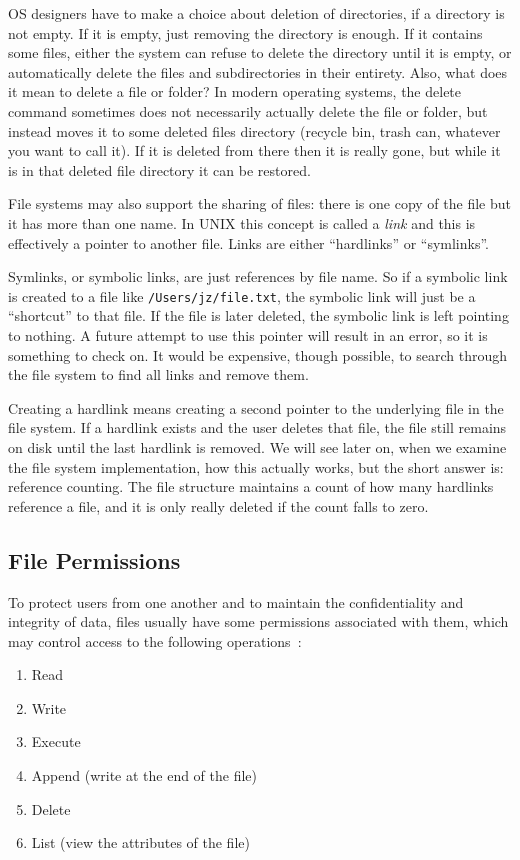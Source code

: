 OS designers have to make a choice about deletion of directories, if a directory is not empty. If it is empty, just removing the directory is enough. If it contains some files, either the system can refuse to delete the directory until it is empty, or automatically delete the files and subdirectories in their entirety. Also, what does it mean to delete a file or folder? In modern operating systems, the delete command sometimes does not necessarily actually delete the file or folder, but instead moves it to some deleted files directory (recycle bin, trash can, whatever you want to call it). If it is deleted from there then it is really gone, but while it is in that deleted file directory it can be restored.

File systems may also support the sharing of files: there is one copy of the file but it has more than one name. In UNIX this concept is called a \textit{link} and this is effectively a pointer to another file. Links are either ``hardlinks'' or ``symlinks''.

Symlinks, or symbolic links, are just references by file name. So if a symbolic link is created to a file like \texttt{/Users/jz/file.txt}, the symbolic link will just be a ``shortcut'' to that file. If the file is later deleted, the symbolic link is left pointing to nothing. A future attempt to use this pointer will result in an error, so it is something to check on. It would be expensive, though possible, to search through the file system to find all links and remove them.

Creating a hardlink means creating a second pointer to the underlying file in the file system. If a hardlink exists and the user deletes that file, the file still remains on disk until the last hardlink is removed. We will see later on, when we examine the file system implementation, how this actually works, but the short answer is: reference counting. The file structure maintains a count of how many hardlinks reference a file, and it is only really deleted if the count falls to zero.

\subsection*{File Permissions}
To protect users from one another and to maintain the confidentiality and integrity of data, files usually have some permissions associated with them, which may control access to the following operations~\cite{osc}:

\begin{enumerate}
	\item Read
	\item Write
	\item Execute
	\item Append (write at the end of the file)
	\item Delete
	\item List (view the attributes of the file)
\end{enumerate}

